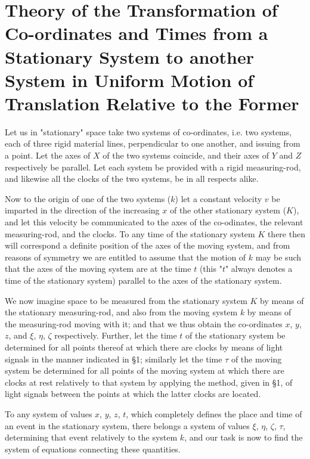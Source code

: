 \section{Theory of the Transformation of Co-ordinates and Times from a Stationary System to another System in Uniform Motion of Translation Relative to the Former}
Let us in "stationary" space take two systems of co-ordinates, i.e. two systems, each of three rigid material lines, perpendicular to one another, and issuing from a point. Let the axes of $X$ of the two systems coincide, and their axes of $Y$ and $Z$ respectively be parallel. Let each system be provided with a rigid measuring-rod, and likewise all the clocks of the two systems, be in all respects alike.

Now to the origin of one of the two systems ($k$) let a constant velocity $v$ be imparted in the direction of the increasing $x$ of the other stationary system ($K$), and let this velocity be communicated to the axes of the co-odinates, the relevant measuring-rod, and the clocks. To any time of the stationary system $K$ there then will correspond a definite position of the axes of the moving system, and from reasons of symmetry we are entitled to assume that the motion of $k$ may be such that the axes of the moving system are at the time $t$ (this "$t$" always denotes a time of the stationary system) parallel to the axes of the stationary system.

We now imagine space to be measured from the stationary system $K$ by means of the stationary measuring-rod, and also from the moving system $k$ by means of the measuring-rod moving with it; and that we thus obtain the co-ordinates $x$, $y$, $z$, and $\xi$, $\eta$, $\zeta$ respectively. Further, let the time $t$ of the stationary system be determined for all points thereof at which there are clocks by means of light signals in the manner indicated in \S 1; similarly let the time $\tau$ of the moving system be determined for all points of the moving system at which there are clocks at rest relatively to that system by applying the method, given in \S 1, of light signals between the points at which the latter clocks are located.

To any system of values $x$, $y$, $z$, $t$, which completely defines the place and time of an event in the stationary system, there belongs a system of values $\xi$, $\eta$, $\zeta$, $\tau$, determining that event relatively to the system $k$, and our task is now to find the system of equations connecting these quantities.


